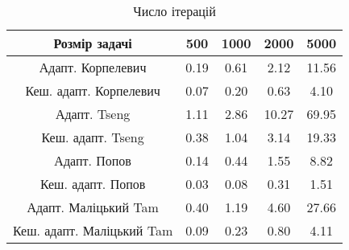 \begin{table}[H]
	\centering
	\begin{tabular}{|c||c|c|c|c|}\hline
		Розмір задачі & 500 & 1000 & 2000 & 5000 \\ \hline \hline
		Адапт. Корпелевич & 0.19 & 0.61 & 2.12 & 11.56 \\ \hline
		Кеш. адапт. Корпелевич & 0.07 & 0.20 & 0.63 & 4.10 \\ \hline
		Адапт. Tseng & 1.11 & 2.86 & 10.27 & 69.95 \\ \hline
		Кеш. адапт. Tseng & 0.38 & 1.04 & 3.14 & 19.33 \\ \hline
		Адапт. Попов & 0.14 & 0.44 & 1.55 & 8.82 \\ \hline
		Кеш. адапт. Попов & 0.03 & 0.08 & 0.31 & 1.51 \\ \hline
		Адапт. Маліцький Tam & 0.40 & 1.19 & 4.60 & 27.66 \\ \hline
		Кеш. адапт. Маліцький Tam & 0.09 & 0.23 & 0.80 & 4.11 \\ \hline
	\end{tabular}
	\caption{Число ітерацій}
\end{table}
